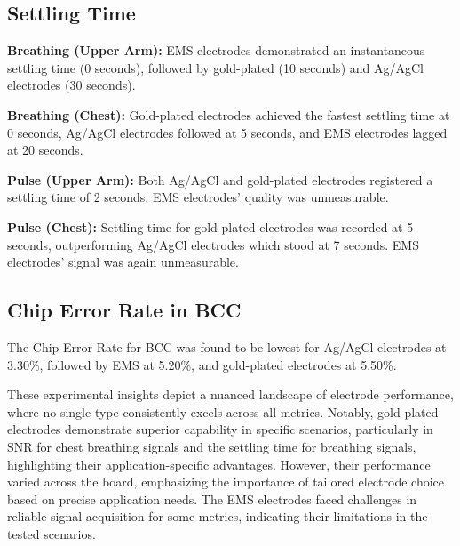 \documentclass[conference]{IEEEtran}
\begin{document}
\subsection{Settling Time}

 \textbf{Breathing (Upper Arm):} EMS electrodes demonstrated an instantaneous settling time (0 seconds), followed by gold-plated (10 seconds) and Ag/AgCl electrodes (30 seconds).
 
    \textbf{Breathing (Chest):} Gold-plated electrodes achieved the fastest settling time at 0 seconds, Ag/AgCl electrodes followed at 5 seconds, and EMS electrodes lagged at 20 seconds.
 
    \textbf{Pulse (Upper Arm):} Both Ag/AgCl and gold-plated electrodes registered a settling time of 2 seconds. EMS electrodes' quality was unmeasurable.

 \textbf{Pulse (Chest):} Settling time for gold-plated electrodes was recorded at 5 seconds, outperforming Ag/AgCl electrodes which stood at 7 seconds. EMS electrodes' signal was again unmeasurable.


\subsection{Chip Error Rate in BCC}

The Chip Error Rate for \gls{BCC} was found to be lowest for Ag/AgCl electrodes at 3.30\%, followed by EMS at 5.20\%, and gold-plated electrodes at 5.50\%.

These experimental insights depict a nuanced landscape of electrode performance, where no single type consistently excels across all metrics. Notably, gold-plated electrodes demonstrate superior capability in specific scenarios, particularly in \gls{SNR} for chest breathing signals and the settling time for breathing signals, highlighting their application-specific advantages. However, their performance varied across the board, emphasizing the importance of tailored electrode choice based on precise application needs. The EMS electrodes faced challenges in reliable signal acquisition for some metrics, indicating their limitations in the tested scenarios.
\end{document}
